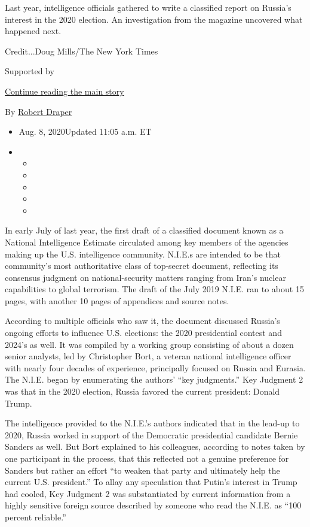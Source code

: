 Last year, intelligence officials gathered to write a classified report
on Russia's interest in the 2020 election. An investigation from the
magazine uncovered what happened next.

Credit...Doug Mills/The New York Times

Supported by

\protect\hyperlink{after-sponsor}{Continue reading the main story}

By \href{https://www.nytimes.com/by/robert-draper}{Robert Draper}

\begin{itemize}
\item
  Aug. 8, 2020Updated 11:05 a.m. ET
\item
  \begin{itemize}
  \item
  \item
  \item
  \item
  \item
  \end{itemize}
\end{itemize}

In early July of last year, the first draft of a classified document
known as a National Intelligence Estimate circulated among key members
of the agencies making up the U.S. intelligence community. N.I.E.s are
intended to be that community's most authoritative class of top-secret
document, reflecting its consensus judgment on national-security matters
ranging from Iran's nuclear capabilities to global terrorism. The draft
of the July 2019 N.I.E. ran to about 15 pages, with another 10 pages of
appendices and source notes.

According to multiple officials who saw it, the document discussed
Russia's ongoing efforts to influence U.S. elections: the 2020
presidential contest and 2024's as well. It was compiled by a working
group consisting of about a dozen senior analysts, led by Christopher
Bort, a veteran national intelligence officer with nearly four decades
of experience, principally focused on Russia and Eurasia. The N.I.E.
began by enumerating the authors' ``key judgments.'' Key Judgment 2 was
that in the 2020 election, Russia favored the current president: Donald
Trump.

The intelligence provided to the N.I.E.'s authors indicated that in the
lead-up to 2020, Russia worked in support of the Democratic presidential
candidate Bernie Sanders as well. But Bort explained to his colleagues,
according to notes taken by one participant in the process, that this
reflected not a genuine preference for Sanders but rather an effort ``to
weaken that party and ultimately help the current U.S. president.'' To
allay any speculation that Putin's interest in Trump had cooled, Key
Judgment 2 was substantiated by current information from a highly
sensitive foreign source described by someone who read the N.I.E. as
``100 percent reliable.''

